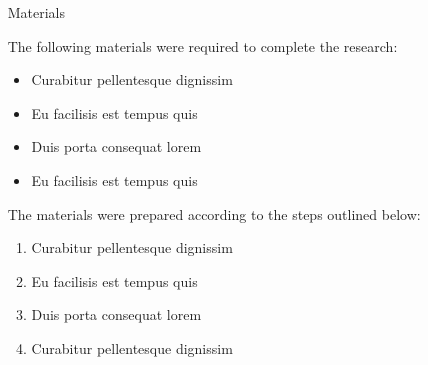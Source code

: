 \documentclass[final]{beamer}
\newlength{\sepwid}
\newlength{\onecolwid}
\newlength{\twocolwid}
\begin{document}
\begin{frame}[t]
\begin{columns}[t]
\begin{column}{\onecolwid}
			
		\end{column} %
		
		\begin{column}{\sepwid}\end{column} %
		
		\begin{column}{\twocolwid} %
			
			\begin{columns}[t,totalwidth=\twocolwid] %
				
				\begin{column}{\onecolwid}\vspace{-.6in} %
					
					
					\begin{block}{Materials}
						
						The following materials were required to complete the research:
						
						\begin{itemize}
							\item Curabitur pellentesque dignissim
							\item Eu facilisis est tempus quis
							\item Duis porta consequat lorem
							\item Eu facilisis est tempus quis
						\end{itemize}
						
						The materials were prepared according to the steps outlined below:
						
						\begin{enumerate}
							\item Curabitur pellentesque dignissim
							\item Eu facilisis est tempus quis
							\item Duis porta consequat lorem
							\item Curabitur pellentesque dignissim
						\end{enumerate}
						

\end{block}
\end{column}
\end{columns}
\end{column}
\end{columns}
\end{frame}
\end{document}
